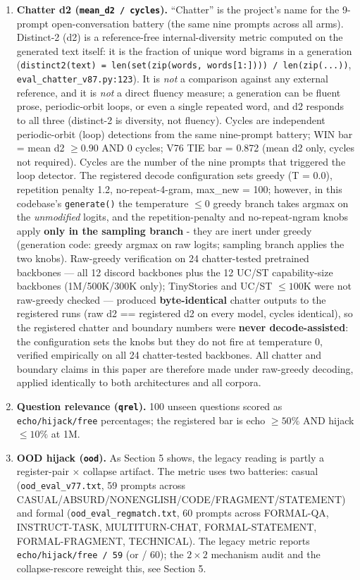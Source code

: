 \documentclass[11pt]{article}
\begin{document}
\begin{enumerate}
  \item \textbf{Chatter d2 (\texttt{mean\_d2 / cycles}).} ``Chatter'' is the project's name for the 9-prompt open-conversation battery (the same nine prompts across all arms). Distinct-2 (d2) is a reference-free internal-diversity metric computed on the generated text itself: it is the fraction of unique word bigrams in a generation (\texttt{distinct2(text) = len(set(zip(words, words[1:]))) / len(zip(...))}, \texttt{eval\_chatter\_v87.py:123}). It is \emph{not} a comparison against any external reference, and it is \emph{not} a direct fluency measure; a generation can be fluent prose, periodic-orbit loops, or even a single repeated word, and d2 responds to all three (distinct-2 is diversity, not fluency). Cycles are independent periodic-orbit (loop) detections from the same nine-prompt battery; WIN bar = mean d2 $\geq 0.90$ AND 0 cycles; V76 TIE bar = 0.872 (mean d2 only, cycles not required). Cycles are the number of the nine prompts that triggered the loop detector. The registered decode configuration sets greedy (T = 0.0), repetition penalty 1.2, no-repeat-4-gram, max\_new = 100; however, in this codebase's \texttt{generate()} the temperature $\leq 0$ greedy branch takes argmax on the \emph{unmodified} logits, and the repetition-penalty and no-repeat-ngram knobs apply \textbf{only in the sampling branch} - they are inert under greedy (generation code: greedy argmax on raw logits; sampling branch applies the two knobs). Raw-greedy verification on 24 chatter-tested pretrained backbones --- all 12 discord backbones plus the 12 UC/ST capability-size backbones (1M/500K/300K only); TinyStories and UC/ST $\leq 100$K were not raw-greedy checked --- produced \textbf{byte-identical} chatter outputs to the registered runs (raw d2 == registered d2 on every model, cycles identical), so the registered chatter and boundary numbers were \textbf{never decode-assisted}: the configuration sets the knobs but they do not fire at temperature 0, verified empirically on all 24 chatter-tested backbones. All chatter and boundary claims in this paper are therefore made under raw-greedy decoding, applied identically to both architectures and all corpora.
  \item \textbf{Question relevance (\texttt{qrel}).} 100 unseen questions scored as \texttt{echo/hijack/free} percentages; the registered bar is echo $\geq 50\%$ AND hijack $\leq 10\%$ at 1M.
  \item \textbf{OOD hijack (\texttt{ood}).} As Section 5 shows, the legacy reading is partly a register-pair $\times$ collapse artifact. The metric uses two batteries: casual (\texttt{ood\_eval\_v77.txt}, 59 prompts across CASUAL/ABSURD/NONENGLISH/CODE/FRAGMENT/STATEMENT) and formal (\texttt{ood\_eval\_regmatch.txt}, 60 prompts across FORMAL-QA, INSTRUCT-TASK, MULTITURN-CHAT, FORMAL-STATEMENT, FORMAL-FRAGMENT, TECHNICAL). The legacy metric reports \texttt{echo/hijack/free / 59} (or / 60); the $2\times 2$ mechanism audit and the collapse-rescore reweight this, see Section 5.
\end{enumerate}
\end{document}
